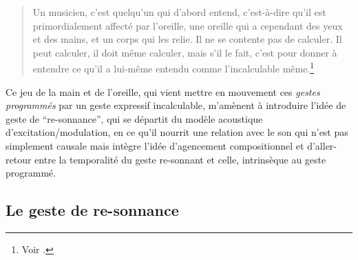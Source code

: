 \blockquote{Un musicien, c'est quelqu'un qui d'abord entend, c'est-à-dire qu'il est primordialement affecté par l'oreille, une oreille qui a cependant des yeux et des mains, et un corps qui les relie. Il ne se contente pas de calculer. Il peut calculer, il doit même calculer, mais s'il le fait, c'est pour donner à entendre ce qu'il a lui-même entendu comme l'incalculable même.\footnote{Voir \cite{stiegler_circuit_2004}.}}
\indent Ce jeu de la main et de l'oreille, qui vient mettre en mouvement ces \textit{gestes programmés} par un geste expressif incalculable, m'amènent à introduire l'idée de geste de ``re-sonnance'', qui se départit du modèle acoustique d'excitation/modulation, en ce qu'il nourrit une relation avec le son qui n'est pas simplement causale mais intègre l'idée d'agencement compositionnel et d'aller-retour entre la temporalité du geste re-sonnant et celle, intrinsèque au geste programmé.

\subsection{Le geste de re-sonnance}

